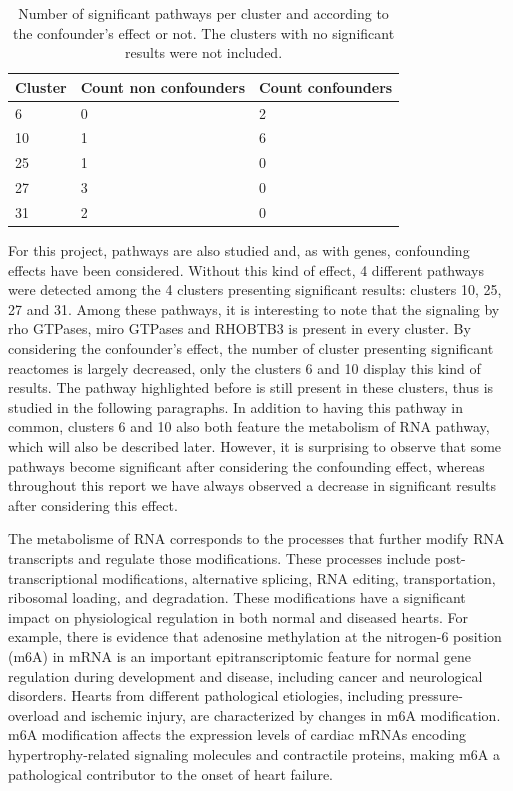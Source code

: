 \documentclass[a4paper, 11pt]{article}
\begin{document}
\begin{multicols}{2}
\begin{table}[H]
	\begin{tabularx}{\textwidth}{|X|X|X|}
	\hline
	Cluster & \multicolumn{1}{c|}{Count non confounders} & Count confounders \\ \hline
	6 & 0 & 2 \\ \hline
	10 & 1 & 6 \\ \hline
	25 & 1 & 0 \\ \hline
	27 & 3 & 0 \\ \hline
	31 & 2 & 0 \\ \hline
	\end{tabularx}
	\caption{Number of significant pathways per cluster and according to the confounder's effect or not. The clusters with no significant results were not included.}
	\label{tab:sigPath}
\end{table}
For this project, pathways are also studied and, as with genes, confounding effects have been considered. Without this kind of effect, 4 different pathways were detected among the 4 clusters presenting significant results: clusters 10, 25, 27 and 31. Among these pathways, it is interesting to note that the signaling by rho GTPases, miro GTPases and RHOBTB3 is present in every cluster. By considering the confounder's effect, the number of cluster presenting significant reactomes is largely decreased, only the clusters 6 and 10 display this kind of results. The pathway highlighted before is still present in these clusters, thus is studied in the following paragraphs. In addition to having this pathway in common, clusters 6 and 10 also both feature the metabolism of RNA pathway, which will also be described later. However, it is surprising to observe that some pathways become significant after considering the confounding effect, whereas throughout this report we have always observed a decrease in significant results after considering this effect.

The  metabolisme  of RNA corresponds to the processes that further modify RNA transcripts and regulate those modifications. These processes include post-transcriptional modifications, alternative splicing, RNA editing, transportation, ribosomal loading, and degradation. These modifications have a significant impact on physiological regulation in both normal and diseased hearts.\citep{Reactome22} 
For example, there is evidence that adenosine methylation at the nitrogen-6 position (m6A) in mRNA is an important epitranscriptomic feature for normal gene regulation during development and disease, including cancer and neurological disorders. Hearts from different pathological etiologies, including pressure-overload and ischemic injury, are characterized by changes in m6A modification. m6A modification affects the expression levels of cardiac mRNAs encoding hypertrophy-related signaling molecules and contractile proteins, making m6A a pathological contributor to the onset of heart failure.\citep{gao2020mrna}


\end{multicols}
\end{document}
